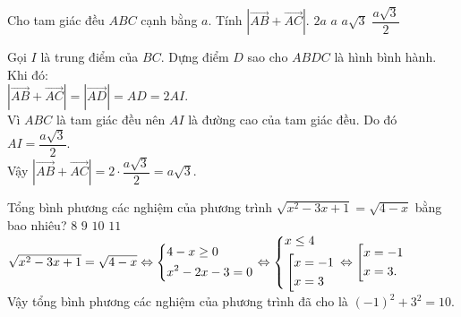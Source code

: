 \begin{ex}%
 Cho tam giác đều $ABC$ cạnh bằng $a$. Tính $\left| \vec{AB} + \vec{AC} \right|$.
 \choice
  {$2a$}
  {$a$}
  {\True $a\sqrt{3}$}
  {$\dfrac{a\sqrt{3}}{2}$}
 \loigiai
 {
 \immini
 {
 Gọi $I$ là trung điểm của $BC$. Dựng điểm $D$ sao cho $ABDC$ là hình bình hành. Khi đó:\\
 $\left| \vec{AB} + \vec{AC} \right| = \left| \vec{AD} \right| = AD = 2AI$.\\
 Vì $ABC$ là tam giác đều nên $AI$ là đường cao của tam giác đều. Do đó $AI = \dfrac{a\sqrt{3}}{2}$.\\
 Vậy $\left| \vec{AB} + \vec{AC} \right| = 2 \cdot \dfrac{a\sqrt{3}}{2} = a\sqrt{3}$.
 }
 {
 }
 }
\end{ex}


\begin{ex}%
 Tổng bình phương các nghiệm của phương trình $\sqrt{x^2 - 3x + 1} = \sqrt{4 - x}$ bằng bao nhiêu?
 \choice
  {$8$}
  {$9$}
  {\True $10$}
  {$11$}
 \loigiai
 {
 $\sqrt{x^2 - 3x + 1} = \sqrt{4 - x} \Leftrightarrow \left\{\begin{aligned}& 4-x \geq 0 \\& x^2 - 2x - 3 = 0\end{aligned}\right. \Leftrightarrow \left\{\begin{aligned}& x \leq 4 \\& \left[\begin{aligned}& x = -1 \\& x = 3\end{aligned}\right.\end{aligned}\right. \Leftrightarrow \left[\begin{aligned}& x = -1 \\& x = 3.\end{aligned}\right.$\\
 Vậy tổng bình phương các nghiệm của phương trình đã cho là $(-1)^2 + 3^2 = 10$.
 }
\end{ex}


